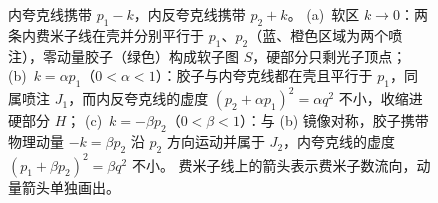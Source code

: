 \begin{figure}[htbp]
{内夸克线携带 $p_1-k$，内反夸克线携带 $p_2+k$。
(a)~软区 $k\to0$：两条内费米子线在壳并分别平行于 $p_1$、$p_2$（蓝、橙色区域为两个喷注），零动量胶子（绿色）构成软子图 $S$，硬部分只剩光子顶点；
(b)~$k=\alpha p_1$（$0<\alpha<1$）：胶子与内夸克线都在壳且平行于 $p_1$，同属喷注 $J_1$，而内反夸克线的虚度 $(p_2+\alpha p_1)^2=\alpha q^2$ 不小，收缩进硬部分 $H$；
(c)~$k=-\beta p_2$（$0<\beta<1$）：与 (b) 镜像对称，胶子携带物理动量 $-k=\beta p_2$ 沿 $p_2$ 方向运动并属于 $J_2$，内夸克线的虚度 $(p_1+\beta p_2)^2=\beta q^2$ 不小。
费米子线上的箭头表示费米子数流向，动量箭头单独画出。}
\label{fig:vertex-regions}
\end{figure}
